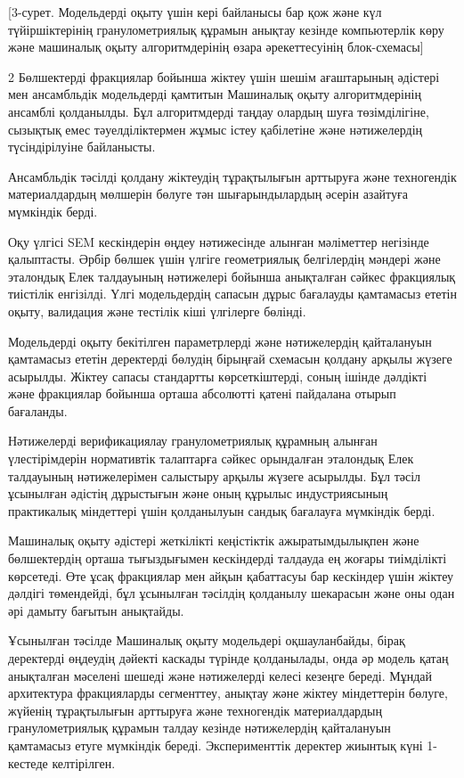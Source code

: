 [3-сурет. Модельдерді оқыту үшін кері байланысы бар қож және күл
түйіршіктерінің гранулометриялық құрамын анықтау кезінде компьютерлік
көру және машиналық оқыту алгоритмдерінің өзара әрекеттесуінің
блок-схемасы]

\begin{multicols}{2}
Бөлшектерді фракциялар бойынша жіктеу үшін шешім ағаштарының әдістері
мен ансамбльдік модельдерді қамтитын Машиналық оқыту алгоритмдерінің
ансамблі қолданылды. Бұл алгоритмдерді таңдау олардың шуға
төзімділігіне, сызықтық емес тәуелділіктермен жұмыс істеу қабілетіне
және нәтижелердің түсіндірілуіне байланысты.

Ансамбльдік тәсілді қолдану жіктеудің тұрақтылығын арттыруға және
техногендік материалдардың мөлшерін бөлуге тән шығарындылардың әсерін
азайтуға мүмкіндік берді.

Оқу үлгісі SEM кескіндерін өңдеу нәтижесінде алынған мәліметтер
негізінде қалыптасты. Әрбір бөлшек үшін үлгіге геометриялық белгілердің
мәндері және эталондық Елек талдауының нәтижелері бойынша анықталған
сәйкес фракциялық тиістілік енгізілді. Үлгі модельдердің сапасын дұрыс
бағалауды қамтамасыз ететін оқыту, валидация және тестілік кіші
үлгілерге бөлінді.

Модельдерді оқыту бекітілген параметрлерді және нәтижелердің қайталануын
қамтамасыз ететін деректерді бөлудің бірыңғай схемасын қолдану арқылы
жүзеге асырылды. Жіктеу сапасы стандартты көрсеткіштерді, соның ішінде
дәлдікті және фракциялар бойынша орташа абсолютті қатені пайдалана
отырып бағаланды.

Нәтижелерді верификациялау гранулометриялық құрамның алынған
үлестірімдерін нормативтік талаптарға сәйкес орындалған эталондық Елек
талдауының нәтижелерімен салыстыру арқылы жүзеге асырылды. Бұл тәсіл
ұсынылған әдістің дұрыстығын және оның құрылыс индустриясының
практикалық міндеттері үшін қолданылуын сандық бағалауға мүмкіндік
берді.

Машиналық оқыту әдістері жеткілікті кеңістіктік ажыратымдылықпен және
бөлшектердің орташа тығыздығымен кескіндерді талдауда ең жоғары
тиімділікті көрсетеді. Өте ұсақ фракциялар мен айқын қабаттасуы бар
кескіндер үшін жіктеу дәлдігі төмендейді, бұл ұсынылған тәсілдің
қолданылу шекарасын және оны одан әрі дамыту бағытын анықтайды.

Ұсынылған тәсілде Машиналық оқыту модельдері оқшауланбайды, бірақ
деректерді өңдеудің дәйекті каскады түрінде қолданылады, онда әр модель
қатаң анықталған мәселені шешеді және нәтижелерді келесі кезеңге береді.
Мұндай архитектура фракцияларды сегменттеу, анықтау және жіктеу
міндеттерін бөлуге, жүйенің тұрақтылығын арттыруға және техногендік
материалдардың гранулометриялық құрамын талдау кезінде нәтижелердің
қайталануын қамтамасыз етуге мүмкіндік береді. Эксперименттік деректер
жиынтық күні 1-кестеде келтірілген.
\end{multicols}

